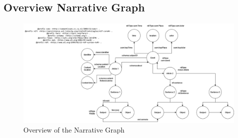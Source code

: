 \documentclass[
hf, %
]{ceurart}
\begin{document}
\subsection{Overview Narrative Graph}
\begin{figure}
	\includegraphics[scale=0.45]{Images/overview_graph.png}
	\caption{Overview of the Narrative Graph}
	\label{fig:graph_overview}
\end{figure}
\end{document}
